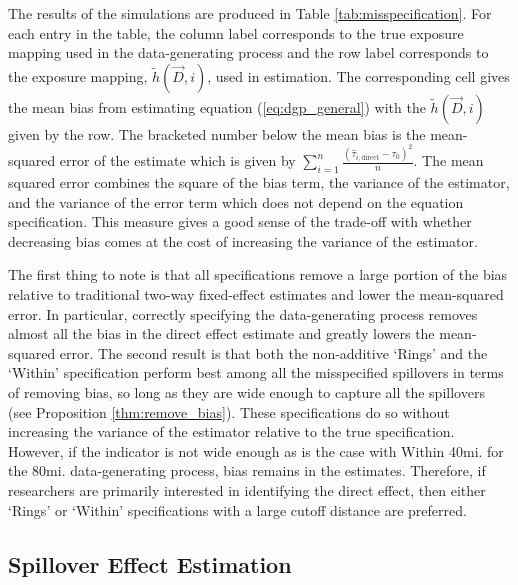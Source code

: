 \documentclass[11pt]{article}
\begin{document}
The results of the simulations are produced in Table \ref{tab:misspecification}. For each entry in the table, the column label corresponds to the true exposure mapping used in the data-generating process and the row label corresponds to the exposure mapping, $\tilde{h}(\vec{D}, i)$, used in estimation.  The corresponding cell gives the mean bias from estimating equation (\ref{eq:dgp_general}) with the $\tilde{h}(\vec{D}, i)$ given by the row. The bracketed number below the mean bias is the mean-squared error of the estimate which is given by $\sum_{i=1}^n \frac{(\hat{\tau}_{i,\text{direct}} - \tau_0)^2}{n}$. The mean squared error combines the square of the bias term, the variance of the estimator, and the variance of the error term which does not depend on the equation specification. This measure gives a good sense of the trade-off with whether decreasing bias comes at the cost of increasing the variance of the estimator.

The first thing to note is that all specifications remove a large portion of the bias relative to traditional two-way fixed-effect estimates and lower the mean-squared error. In particular, correctly specifying the data-generating process removes almost all the bias in the direct effect estimate and greatly lowers the mean-squared error. The second result is that both the non-additive `Rings' and the `Within' specification perform best among all the misspecified spillovers in terms of removing bias, so long as they are wide enough to capture all the spillovers (see Proposition \ref{thm:remove_bias}). These specifications do so without increasing the variance of the estimator relative to the true specification. However, if the indicator is not wide enough as is the case with Within 40mi. for the 80mi. data-generating process, bias remains in the estimates. Therefore, if researchers are primarily interested in identifying the direct effect, then either `Rings' or `Within' specifications with a large cutoff distance are preferred.

\subsection{Spillover Effect Estimation}
\end{document}
